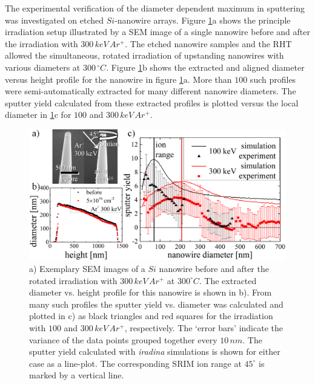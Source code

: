 The experimental verification of the diameter dependent maximum in sputtering was investigated on etched $Si$-nanowire arrays. Figure \ref{sputtering_exp}a shows the principle irradiation setup illustrated by a SEM image of a single nanowire before and after the irradiation with $300\,keV\,Ar^+$. The etched nanowire samples and the RHT allowed the simultaneous, rotated irradiation of upstanding nanowires with various diameters at $300\,^\circ C$. Figure \ref{sputtering_exp}b shows the extracted and aligned diameter versus height profile for the nanowire in figure \ref{sputtering_exp}a. More than $100$ such profiles were semi-automatically extracted for many different nanowire diameters. The sputter yield calculated from these extracted profiles is plotted versus the local diameter in \ref{sputtering_exp}c for $100$ and $300\,keV\,Ar^+$.

\begin{figure}[th]
	\centering
		\includegraphics[width=.95\textwidth]{images/sputter_exp.png}
	\caption{a) Exemplary SEM images of a $Si$ nanowire before and after the rotated irradiation with $300\,keV\,Ar^+$ at $300^\circ C$. The extracted diameter vs. height profile for this nanowire is shown in b). From many such profiles the sputter yield vs. diameter was calculated and plotted in c) as black triangles and red squares for the irradiation with $100$ and $300\,keV\,Ar^+$, respectively. The `error bars' indicate the variance of the data points grouped together every $10\,nm$. The sputter yield calculated with \emph{iradina} simulations is shown for either case as a line-plot. The corresponding SRIM ion range at $45^\circ$ is marked by a vertical line.} 
	\label{sputtering_exp}
\end{figure} 

